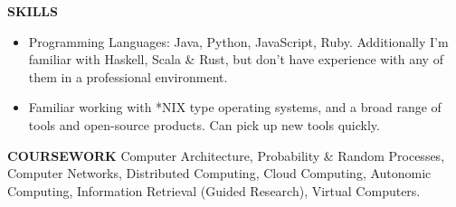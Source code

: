 \documentclass[10pt, letterpaper]{article}
\begin{document}

\textbf{SKILLS}
\smallskip 
\begin{itemize}
    \item Programming Languages: Java, Python, JavaScript, Ruby. Additionally I'm familiar with Haskell, Scala \& Rust, but don't have experience with any of them in a professional environment.
    \item Familiar working with *NIX type operating systems, and a broad range of tools and open-source products. Can pick up new tools quickly.
\end{itemize} 

\textbf{COURSEWORK}
\smallskip 
\newline
Computer Architecture, Probability \& Random Processes, Computer Networks, 
Distributed Computing, Cloud Computing, Autonomic Computing, Information Retrieval (Guided Research), Virtual Computers.
\end{document}
